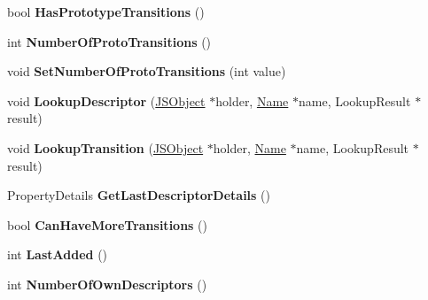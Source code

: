 \begin{DoxyCompactItemize}
\item 
\hypertarget{classv8_1_1internal_1_1_map_a008f673464e75ce02585af308e0a74b5}{}bool {\bfseries Has\+Prototype\+Transitions} ()\label{classv8_1_1internal_1_1_map_a008f673464e75ce02585af308e0a74b5}

\item 
\hypertarget{classv8_1_1internal_1_1_map_ad0158525f6e49424acb7964f3ca4da1c}{}int {\bfseries Number\+Of\+Proto\+Transitions} ()\label{classv8_1_1internal_1_1_map_ad0158525f6e49424acb7964f3ca4da1c}

\item 
\hypertarget{classv8_1_1internal_1_1_map_a42924a422bc0c292a2d213394ec01770}{}void {\bfseries Set\+Number\+Of\+Proto\+Transitions} (int value)\label{classv8_1_1internal_1_1_map_a42924a422bc0c292a2d213394ec01770}

\item 
\hypertarget{classv8_1_1internal_1_1_map_a90257ce13b572361423d39375e4ffaa2}{}void {\bfseries Lookup\+Descriptor} (\hyperlink{classv8_1_1internal_1_1_j_s_object}{J\+S\+Object} $\ast$holder, \hyperlink{classv8_1_1internal_1_1_name}{Name} $\ast$name, Lookup\+Result $\ast$result)\label{classv8_1_1internal_1_1_map_a90257ce13b572361423d39375e4ffaa2}

\item 
\hypertarget{classv8_1_1internal_1_1_map_a49f8740583f2baa2956e9bec878661bd}{}void {\bfseries Lookup\+Transition} (\hyperlink{classv8_1_1internal_1_1_j_s_object}{J\+S\+Object} $\ast$holder, \hyperlink{classv8_1_1internal_1_1_name}{Name} $\ast$name, Lookup\+Result $\ast$result)\label{classv8_1_1internal_1_1_map_a49f8740583f2baa2956e9bec878661bd}

\item 
\hypertarget{classv8_1_1internal_1_1_map_a65a92d49fd359b45d9133908b5519f7d}{}Property\+Details {\bfseries Get\+Last\+Descriptor\+Details} ()\label{classv8_1_1internal_1_1_map_a65a92d49fd359b45d9133908b5519f7d}

\item 
\hypertarget{classv8_1_1internal_1_1_map_a63ba62e20277534fe21e10cbbb4e0558}{}bool {\bfseries Can\+Have\+More\+Transitions} ()\label{classv8_1_1internal_1_1_map_a63ba62e20277534fe21e10cbbb4e0558}

\item 
\hypertarget{classv8_1_1internal_1_1_map_a23535159e272ca1b2b1d41d972bf2024}{}int {\bfseries Last\+Added} ()\label{classv8_1_1internal_1_1_map_a23535159e272ca1b2b1d41d972bf2024}

\item 
\hypertarget{classv8_1_1internal_1_1_map_a0b40d3fcd95554e43b2ffc0c3a2218ea}{}int {\bfseries Number\+Of\+Own\+Descriptors} ()\label{classv8_1_1internal_1_1_map_a0b40d3fcd95554e43b2ffc0c3a2218ea}


\end{DoxyCompactItemize}
